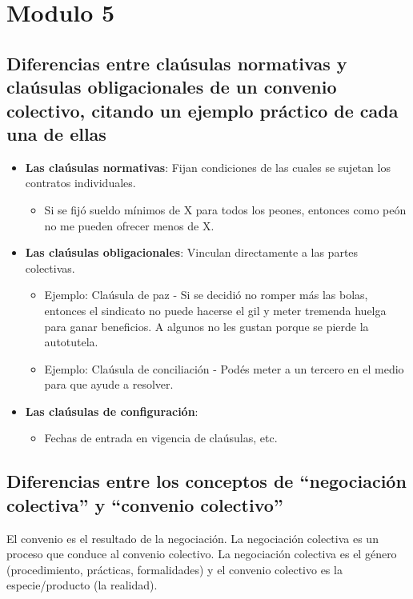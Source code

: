 \documentclass[spanish,12pt,a4paper,titlepage]{report}
\begin{document}
\section{Modulo 5}

\subsection{Diferencias entre claúsulas normativas y claúsulas obligacionales de un convenio colectivo, citando un ejemplo práctico de cada una de ellas}

\begin{itemize}
\item \textbf{Las claúsulas normativas}: Fijan condiciones de las cuales se sujetan los contratos individuales.
\begin{itemize}
\item Si se fijó sueldo mínimos de X para todos los peones, entonces como peón no me pueden ofrecer menos de X.
\end{itemize}

\item \textbf{Las claúsulas obligacionales}: Vinculan directamente a las partes colectivas.
\begin{itemize}
\item Ejemplo: Claúsula de paz - Si se decidió no romper más las bolas, entonces el sindicato no puede hacerse el gil y meter tremenda huelga para ganar beneficios. A algunos no les gustan porque se pierde la autotutela.
\item Ejemplo: Claúsula de conciliación - Podés meter a un tercero en el medio para que ayude a resolver.
\end{itemize}

\item \textbf{Las claúsulas de configuración}:
\begin{itemize}
\item Fechas de entrada en vigencia de claúsulas, etc.
\end{itemize}
\end{itemize}

\subsection{Diferencias entre los conceptos de ``negociación colectiva'' y ``convenio colectivo''}
\label{sec:diferencias-entre-los-conceptos-de-neg-col-y-con-col}

El convenio es el resultado de la negociación. La negociación colectiva es un proceso que conduce al convenio colectivo. La negociación colectiva es el género (procedimiento, prácticas, formalidades) y el convenio colectivo es la especie/producto (la realidad).
\end{document}
